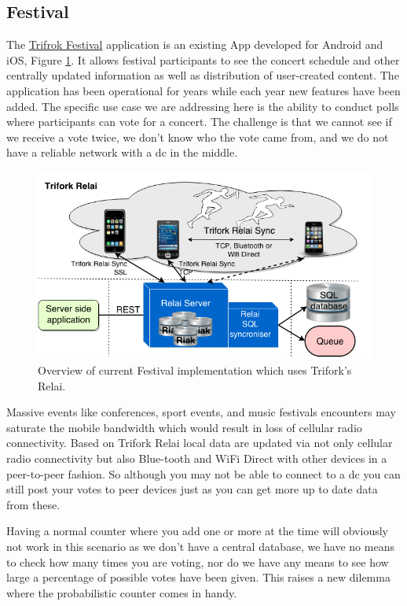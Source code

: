 \subsection{Festival}
The \href{https://www.trifork.com/news/roskilde-festival}{Trifrok Festival} application is an existing App developed for Android and iOS, Figure \ref{fig:relai_layout}. It allows festival participants to see the concert schedule and other centrally updated information as well as distribution of user-created content. The application has been operational for years while each year new features have been added. The specific use case we are addressing here is the ability to conduct polls where participants can vote for a concert. The challenge is that we cannot see if we receive a vote twice, we don't know who the vote came from, and we do not have a reliable network with a \gls{dc} in the middle.
\begin{figure}[!ht]
	\centering
	\includegraphics[width=1.05\textwidth]{figures/TriforkRelai.png}
	
	\caption{Overview of current Festival implementation which uses Trifork's Relai.}
	\label{fig:relai_layout}
\end{figure}

Massive events like conferences, sport events, and music festivals encounters may saturate the mobile bandwidth which would result in loss of cellular radio connectivity. Based on Trifork Relai local data are updated via not only cellular radio connectivity but also Blue-tooth and WiFi Direct with other devices in a peer-to-peer fashion. So although you may not be able to connect to a \gls{dc} you can still post your votes to peer devices just as you can get more up to date data from these.

Having a normal counter where you add one or more at the time will obviously not work in this scenario as we don't have a central database, we have no means to check how many times you are voting, nor do we have any means to see how large a percentage of possible votes have been given. This raises a new dilemma where the probabilistic counter comes in handy.

